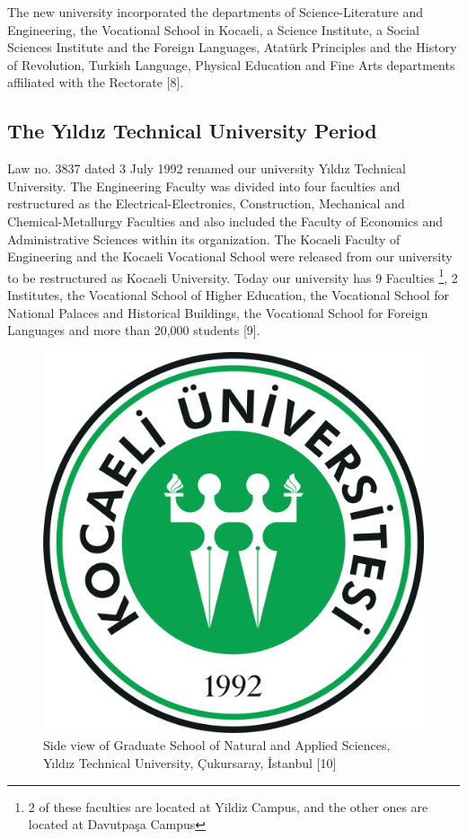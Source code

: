 The new university incorporated the departments of Science-Literature and Engineering, the Vocational School in Kocaeli, a Science Institute, a Social Sciences Institute and the Foreign Languages, Atatürk Principles and the History of Revolution, Turkish Language, Physical Education and Fine Arts departments affiliated with the Rectorate [8].

\subsection{The Yıldız Technical University Period}
Law no. 3837 dated 3 July 1992 renamed our university Yıldız Technical University. The Engineering Faculty was divided into four faculties and restructured as the Electrical-Electronics, Construction, Mechanical and Chemical-Metallurgy Faculties and also included the Faculty of Economics and Administrative Sciences within its organization. The Kocaeli Faculty of Engineering and the Kocaeli Vocational School were released from our university to be restructured as Kocaeli University. Today our university has 9 Faculties \footnote{2 of these faculties are located at Yildiz Campus, and the other ones are located at Davutpaşa Campus}, 2 Institutes, the Vocational School of Higher Education, the Vocational School for National Palaces and Historical Buildings, the Vocational School for Foreign Languages and more than 20,000 students [9]. 

\begin{figure}[htbp]
\centering
\includegraphics[width=\textwidth]{thesisChapters/images/Picture3}
\caption{Side view of Graduate School of Natural and Applied Sciences, Yıldız Technical University, Çukursaray, İstanbul [10]}
\end{figure}

